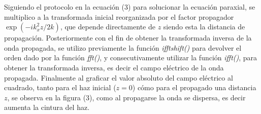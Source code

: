 \documentclass[11pt,letterpaper,twocolumn]{article}
\begin{document}
\par 
Siguiendo el protocolo en la ecuación (3) para solucionar la ecuación paraxial, se multiplico a la transformada inicial reorganizada por el factor propagador $\exp(-i k_{x}^{2}z/2k)$, que depende directamente de $z$ siendo esta la distancia de propagación. Posteriormente con el fin de obtener la transformada inversa de la onda propagada, se utilizo previamente la función \textit{ifftshift()} para devolver el orden dado por la función \textit{fft()}, y consecutivamente utilizar la función \textit{ifft()}, para obtener la transformada inversa, es decir el campo eléctrico de la onda propagada. Finalmente al graficar el valor absoluto del campo eléctrico al cuadrado, tanto para el haz inicial ($z=0$) cómo para el propagado una distancia $z$, se observa en la figura (3), como al propagarse la onda se dispersa, es decir aumenta la cintura del haz.\\
\end{document}
